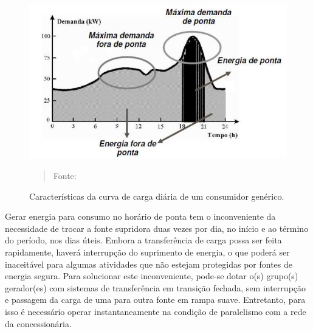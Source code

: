\begin{figure}[!htb]
\begin{center}
			\caption{Características da curva de carga diária de um consumidor genérico.}

\includegraphics[width=.9\textwidth]{Figuras/ponta.png}
            \vspace*{\fill} 
            \begin{quote} 
            \centering 
            Fonte: \cite{procel}
            \end{quote}
            \vspace*{\fill}
			\label{fig:ponta}
\end{center}
\end{figure}

Gerar  energia  para  consumo  no  horário  de  ponta  tem  o  inconveniente  da  necessidade  de trocar a  fonte  supridora  duas  vezes  por  dia,  no início e ao término  do  período,  nos  dias  úteis.  Embora  a  transferência  de  carga  possa  ser  feita  rapidamente,  haverá interrupção do suprimento de energia, o que poderá ser inaceitável para algumas  atividades que não estejam protegidas por fontes de energia segura. Para solucionar este inconveniente,  pode-se  dotar  o(s)  grupo(s)  gerador(es)  com  sistemas  de  transferência  em transição fechada, sem interrupção e passagem da carga de uma para outra fonte em  rampa suave. Entretanto, para isso é necessário operar instantaneamente na condição de  paralelismo com a rede da concessionária. \cite{costa}